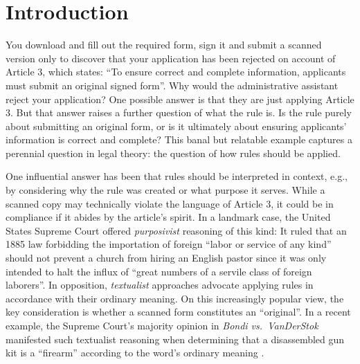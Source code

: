 \documentclass[pdflatex,sn-nature]{sn-jnl}
\begin{document}

\maketitle

\section{Introduction}\label{sec:intro}

You download and fill out the required form, sign it and submit a scanned version only to discover that your application has been rejected on account of Article 3, which states: ``To ensure correct and complete information, applicants must submit an original signed form''. Why would the administrative assistant reject your application? One possible answer is that they are just applying Article 3. But that answer raises a further question of what the rule is. Is the rule purely about submitting an original form, or is it ultimately about ensuring applicants' information is correct and complete? This banal but relatable example captures a perennial question in legal theory: the question of how rules should be applied.

One influential answer has been that rules should be interpreted in context, e.g., by considering why the rule was created or what purpose it serves. While a scanned copy may technically violate the language of Article 3, it could be in compliance if it abides by the article's spirit. In a landmark case, the United States Supreme Court offered \textit{purposivist} reasoning of this kind: It ruled that an 1885 law forbidding the importation of foreign ``labor or service of any kind'' should not prevent a church from hiring an English pastor since it was only intended to halt the influx of ``great numbers of a servile class of foreign laborers''\cite{ref1}. In opposition, \textit{textualist} approaches advocate applying rules in accordance with their ordinary meaning\cite{ref2}. On this increasingly popular view, the key consideration is whether a scanned form constitutes an ``original''. In a recent example, the Supreme Court's majority opinion in \textit{Bondi vs.\ VanDerStok} manifested such textualist reasoning when determining that a disassembled gun kit is a ``firearm'' according to the word's ordinary meaning \cite{garland_amicus_2024}.
\end{document}
